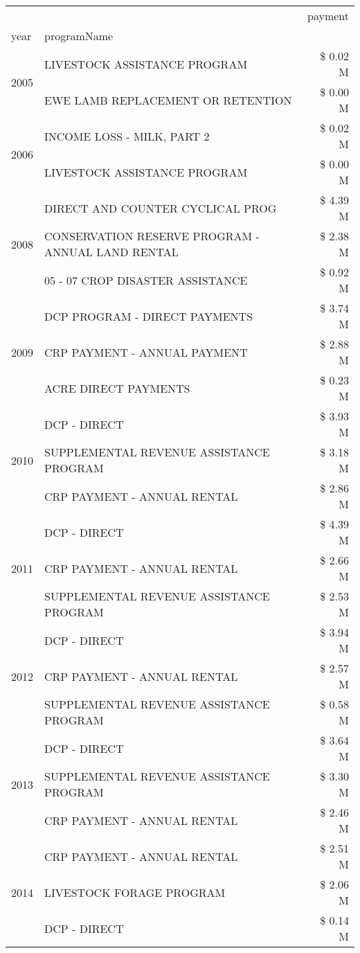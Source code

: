 \begin{tabular}{llr}
\toprule
 &  & payment \\
year & programName &  \\
\midrule
\multirow[t]{2}{*}{2005} & LIVESTOCK ASSISTANCE PROGRAM & \$ 0.02 M \\
 & EWE LAMB REPLACEMENT OR RETENTION & \$ 0.00 M \\
\cline{1-3}
\multirow[t]{2}{*}{2006} & INCOME LOSS - MILK, PART 2 & \$ 0.02 M \\
 & LIVESTOCK ASSISTANCE PROGRAM & \$ 0.00 M \\
\cline{1-3}
\multirow[t]{3}{*}{2008} & DIRECT AND COUNTER CYCLICAL PROG & \$ 4.39 M \\
 & CONSERVATION RESERVE PROGRAM - ANNUAL LAND RENTAL & \$ 2.38 M \\
 & 05 - 07 CROP DISASTER ASSISTANCE & \$ 0.92 M \\
\cline{1-3}
\multirow[t]{3}{*}{2009} & DCP PROGRAM - DIRECT PAYMENTS & \$ 3.74 M \\
 & CRP PAYMENT - ANNUAL PAYMENT & \$ 2.88 M \\
 & ACRE DIRECT PAYMENTS & \$ 0.23 M \\
\cline{1-3}
\multirow[t]{3}{*}{2010} & DCP - DIRECT & \$ 3.93 M \\
 & SUPPLEMENTAL REVENUE ASSISTANCE PROGRAM & \$ 3.18 M \\
 & CRP PAYMENT - ANNUAL RENTAL & \$ 2.86 M \\
\cline{1-3}
\multirow[t]{3}{*}{2011} & DCP - DIRECT & \$ 4.39 M \\
 & CRP PAYMENT - ANNUAL RENTAL & \$ 2.66 M \\
 & SUPPLEMENTAL REVENUE ASSISTANCE PROGRAM & \$ 2.53 M \\
\cline{1-3}
\multirow[t]{3}{*}{2012} & DCP - DIRECT & \$ 3.94 M \\
 & CRP PAYMENT - ANNUAL RENTAL & \$ 2.57 M \\
 & SUPPLEMENTAL REVENUE ASSISTANCE PROGRAM & \$ 0.58 M \\
\cline{1-3}
\multirow[t]{3}{*}{2013} & DCP - DIRECT & \$ 3.64 M \\
 & SUPPLEMENTAL REVENUE ASSISTANCE PROGRAM & \$ 3.30 M \\
 & CRP PAYMENT - ANNUAL RENTAL & \$ 2.46 M \\
\cline{1-3}
\multirow[t]{3}{*}{2014} & CRP PAYMENT - ANNUAL RENTAL & \$ 2.51 M \\
 & LIVESTOCK FORAGE PROGRAM & \$ 2.06 M \\
 & DCP - DIRECT & \$ 0.14 M \\

\end{tabular}
